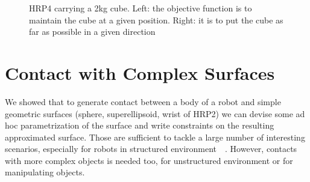 \begin{figure}
\centering
  \centering
  \setlength\fboxsep{0pt}
  \setlength\fboxrule{1pt}
\caption{HRP4 carrying a 2kg cube.
Left: the objective function is to maintain the cube at a given position.
Right: it is to put the cube as far as possible in a given direction}
\label{fig:hrp4_cube}
\end{figure}

\section{Contact with Complex Surfaces}
\label{sec:contact_with_complex_surfaces}

We showed that to generate contact between a body of a robot and simple geometric surfaces (sphere, superellipsoid, wrist of HRP2) we can devise some ad hoc parametrization of the surface and write constraints on the resulting approximated surface.
Those are sufficient to tackle a large number of interesting scenarios, especially for robots in structured environment~\cite{vaillant:humanoids:2014}~\cite{vaillant:autonomousrobots:2016}.
However, contacts with more complex objects is needed too, for unstructured environment or for manipulating objects.



